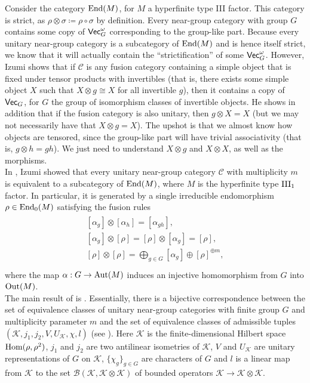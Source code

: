\noindent Consider the category $\textup{End}(M)$, for $M$ a hyperfinite type III factor. This category is strict, as $\rho \otimes \sigma \coloneqq \rho \circ \sigma$ by definition. Every near-group category with group $G$ contains some copy of $\textup{\textsf{Vec}}_G^\omega$ corresponding to the group-like part. Because every unitary near-group category is a subcategory of $\textup{End}(M)$ and is hence itself strict, we know that it will actually contain the ``strictification'' of some $\textup{\textsf{Vec}}_G^\omega$. However, Izumi shows that if $\mathcal{C}$ is any fusion category containing a simple object that is fixed under tensor products with invertibles (that is, there exists some simple object $X$ such that $X \otimes g \cong X$ for all invertible $g$), then it contains a copy of $\textup{\textsf{Vec}}_G$, for $G$ the group of isomorphism classes of invertible objects. He shows in addition that if the fusion category is also unitary, then $g \otimes X = X$ (but we may not necessarily have that $X \otimes g = X$). The upshot is that we almost know how objects are tensored, since the group-like part will have trivial associativity (that is, $g \otimes h = gh$). We just need to understand $X \otimes g$ and $X \otimes X$, as well as the morphisms.\\

\noindent In \cite{Izu17}, Izumi showed that every unitary near-group category $\mathcal{C}$ with multiplicity $m$ is equivalent to a subcategory of $\textup{End}(M)$, where $M$ is the hyperfinite type $\textup{III}_1$ factor. In particular, it is generated by a single irreducible endomorphism $\rho \in \textup{End}_0(M)$ satisfying the fusion rules
\begin{align*}
\begin{split}
[\alpha_g] \otimes [\alpha_h] = [\alpha_{gh}],\\
[\alpha_g] \otimes [\rho] = [\rho] \otimes [\alpha_g] = [\rho],\\
[\rho] \otimes [\rho] = \bigoplus_{g \in G} [\alpha_g] \oplus [\rho]^{\oplus m},\\
\end{split}
\end{align*}
\noindent where the map $\alpha : G \to \textup{Aut}(M)$ induces an injective homomorphism from $G$ into $\textup{Out}(M)$.\\

\noindent The main result of \cite{Izu17} is \cite[Theorem 4.9]{Izu17}. Essentially, there is a bijective correspondence between the set of equivalence classes of unitary near-group categories with finite group $G$ and multiplicity parameter $m$ and the set of equivalence classes of admissible tuples $(\mathcal{K}, j_1, j_2, V, U_\mathcal{K}, \chi, l)$ (see \cite[Definition 4.8]{Izu17}). Here $\mathcal{K}$ is the finite-dimensional Hilbert space $\textup{Hom}(\rho, \rho^2)$, $j_1$ and $j_2$ are two antilinear isometries of $\mathcal{K}$, $V$ and $U_\mathcal{K}$ are unitary representations of $G$ on $\mathcal{K}$, $\{\chi_g\}_{g \in G}$ are characters of $G$ and $l$ is a linear map from $\mathcal{K}$ to the set $\mathcal{B}(\mathcal{K}, \mathcal{K} \otimes \mathcal{K})$ of bounded operators $\mathcal{K} \to \mathcal{K} \otimes \mathcal{K}$.\\

